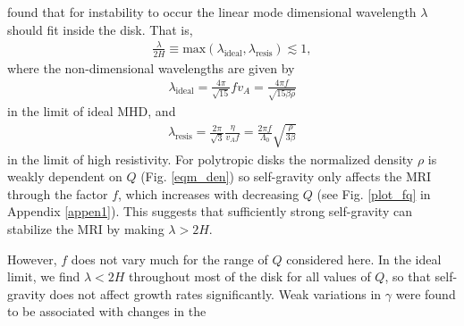 \cite{sano99} found that for instability to occur the linear mode
dimensional wavelength $\lambda$ should fit inside the disk. That is,   
\begin{align}\label{sano_crit}
  \frac{\lambda}{2H} \equiv
  \mathrm{max}\left(\lambda_\mathrm{ideal},\lambda_\mathrm{resis}\right)\lesssim
  1, 
\end{align}
where the non-dimensional wavelengths are given by 
\begin{align}\label{lambda_ideal}
  \lambda_\mathrm{ideal} = \frac{4\pi}{\sqrt{15}} f v_A =
  \frac{4\pi f}{\sqrt{15\beta\rho}}
\end{align}
in the limit of ideal MHD, and 
\begin{align}\label{lambda_resis}
  \lambda_\mathrm{resis} = \frac{2\pi}{\sqrt{3}}\frac{\eta}{v_A f} =
  \frac{2\pi f}{\Lambda_0}\sqrt{\frac{\rho}{3\beta}} 
\end{align}
in the limit of high resistivity. 
For polytropic disks the normalized density $\rho$ is weakly dependent
on $Q$ (Fig. \ref{eqm_den}) so self-gravity only affects the
MRI through the factor $f$, which increases with decreasing $Q$ (see
Fig. \ref{plot_fq} in Appendix \ref{appen1}). This suggests that
sufficiently strong self-gravity can stabilize the MRI by making
$\lambda > 2H$. 
 

However, $f$ does not vary much for the range of $Q$ considered here. 
In the ideal limit, we find $\lambda < 2H$ throughout most of the disk
for all values of $Q$, so that self-gravity does not affect growth
rates significantly. Weak variations in $\gamma$ were found to be
associated with changes in the 





